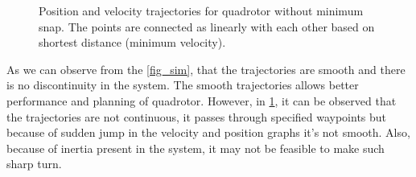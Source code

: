 \documentclass[conference,onecolumn,10pt]{IEEEtran}
\begin{document}
\begin{figure}[htpb]
\centering
{}
\hfil
{}
\caption{Position and velocity trajectories for quadrotor without minimum snap. The points are connected as linearly with each other based on shortest distance (minimum velocity).}
\label{fig_sim1}
\end{figure}

\FloatBarrier
As we can observe from the \ref{fig_sim}, that the trajectories are smooth and there is no discontinuity in the system. The smooth trajectories allows better performance and planning of quadrotor. However, in \ref{fig_sim1}, it can be observed that the trajectories are not continuous, it passes through specified waypoints but because of sudden jump in the velocity and position graphs it's not smooth. Also, because of inertia present in the system, it may not be feasible to make such sharp turn.

\end{document}
